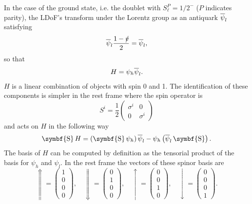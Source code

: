 In the case of the ground state, i.e. the doublet with $S_\ell^P = \left. 1/2 \right.^-$ ($P$ indicates parity), the LDoF's transform under the Lorentz group as an antiquark $\overline{\psi}_l$ satisfying
\begin{equation}
  \overline{\psi}_l \frac{1 - \slashed{v}}{2} = \overline{\psi}_l ,
\end{equation}
so that
\begin{equation}
  H = \psi_h \overline{\psi}_l .
\end{equation}
$H$ is a linear combination of objects with spin 0 and 1. The identification of these components is simpler in the rest frame where the spin operator is
\begin{equation}
  S^i = \frac{1}{2} \begin{pmatrix} \sigma^i & 0 \\ 0 & \sigma^i \end{pmatrix}
\end{equation}
and acts on $H$ in the following way
\begin{equation}
  \operatorname{\symbf{S}} H = \left( \operatorname{\symbf{S}} \psi_h \right) \adj{\psi}_l - \psi_h \left( \adj{\psi}_l \operatorname{\symbf{S}} \right) .
  \label{eq:spin_action_on_H}
\end{equation}
The basis of $H$ can be computed by definition as the tensorial product of the basis for $\psi_h$ and $\psi_l$. In the rest frame the vectors of these spinor basis are
\begin{equation}
  \Uparrow = \begin{pmatrix} 1 \\ 0 \\ 0 \\ 0 \end{pmatrix} , \quad
  \Downarrow = \begin{pmatrix} 0 \\ 1 \\ 0 \\ 0 \end{pmatrix} , \quad 
  \uparrow = \begin{pmatrix} 0 \\ 0 \\ 1 \\ 0 \end{pmatrix} , \quad 
  \downarrow = \begin{pmatrix} 0 \\ 0 \\ 0 \\ 1 \end{pmatrix} .
\end{equation}
